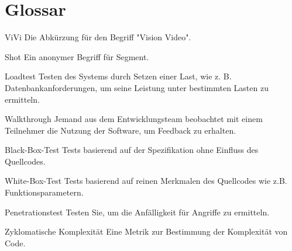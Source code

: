 \section{Glossar}

	\begin{description}
	\item{ViVi} Die Abkürzung für den Begriff "Vision Video".
	\end{description}

	\begin{description}
	\item{Shot} Ein anonymer Begriff für Segment.
	\end{description}

	\begin{description}
	\item{Loadtest} Testen des Systems durch Setzen einer Last, wie z. B. Datenbankanforderungen, um seine Leistung unter bestimmten Lasten zu ermitteln.
	\end{description}
	
	\begin{description}
    \item{Walkthrough} Jemand aus dem Entwicklungsteam beobachtet mit einem Teilnehmer die Nutzung der Software, um Feedback zu erhalten.
    \end{description}
    
    \begin{description}
    \item{Black-Box-Test} Tests basierend auf der Spezifikation ohne Einfluss des Quellcodes.
    \end{description}
    
    \begin{description}
    \item{White-Box-Test} Tests basierend auf reinen Merkmalen des Quellcodes wie z.B. 
    Funktionsparametern.
    \end{description}
    
    \begin{description}
    \item{Penetrationstest} Testen Sie, um die Anfälligkeit für Angriffe zu ermitteln.
    \end{description}
    
    \begin{description}
    \item{Zyklomatische Komplexität} Eine Metrik zur Bestimmung der Komplexität von Code.
	\end{description}
